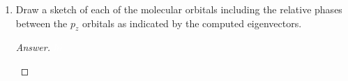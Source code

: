 \documentclass[../psets.tex]{subfiles}
\begin{document}
\begin{enumerate}
\begin{enumerate}
\begin{proof}[Answer]
\begin{figure}[h!]
                \begin{subfigure}[b]{0.2\linewidth}
                    \centering
                    \begin{equation*}
                        \boxed{
                            \begin{bmatrix}
                                1/2\\
                                1/2\\
                                1/2\\
                                1/2\\
                            \end{bmatrix}
                        }
                    \end{equation*}
                    \caption{}
                \end{subfigure}
            \end{figure}
        \end{proof}
        \item Draw a sketch of each of the molecular orbitals including the relative phases between the $p_z$ orbitals as indicated by the computed eigenvectors.
        \begin{proof}[Answer]
            ${\color{white}hi}$
            \begin{figure}[h!]
                \centering
                \footnotesize
                \begin{subfigure}[b]{0.24\linewidth}
                    \centering
\end{subfigure}
\end{figure}
\end{proof}
\end{enumerate}
\end{enumerate}
\end{document}
